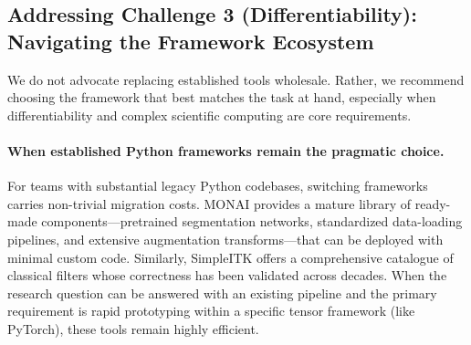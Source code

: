 \documentclass[10pt,letterpaper]{article}
\begin{document}
\subsection*{Addressing Challenge 3 (Differentiability): Navigating the Framework Ecosystem}
We do not advocate replacing established tools wholesale. Rather, we recommend choosing the framework that best matches the task at hand, especially when differentiability and complex scientific computing are core requirements.

\paragraph{When established Python frameworks remain the pragmatic choice.}
For teams with substantial legacy Python codebases, switching frameworks carries non-trivial migration costs. MONAI provides a mature library of ready-made components---pretrained segmentation networks, standardized data-loading pipelines, and extensive augmentation transforms---that can be deployed with minimal custom code. Similarly, SimpleITK offers a comprehensive catalogue of classical filters whose correctness has been validated across decades. When the research question can be answered with an existing pipeline and the primary requirement is rapid prototyping within a specific tensor framework (like PyTorch), these tools remain highly efficient.
\end{document}
